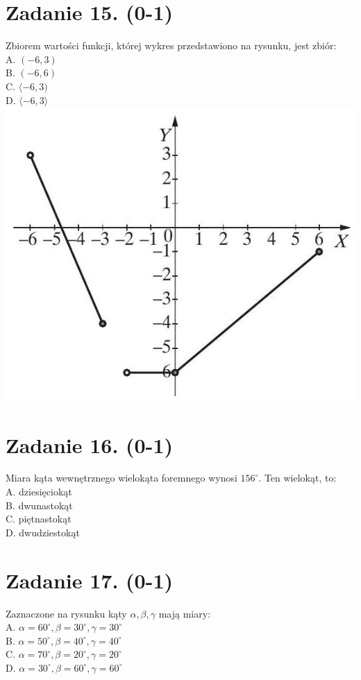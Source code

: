 \documentclass[10pt]{article}
\begin{document}
\section*{Zadanie 15. (0-1)}
Zbiorem wartości funkcji, której wykres przedstawiono na rysunku, jest zbiór:\\
A. \((-6,3)\)\\
B. \((-6,6)\)\\
C. \(\langle-6,3)\)\\
D. \(\langle-6,3\rangle\)\\
\includegraphics[max width=\textwidth, center]{2024_11_21_cdea326d19d0c2132b88g-06}

\section*{Zadanie 16. (0-1)}
Miara kąta wewnętrznego wielokąta foremnego wynosi \(156^{\circ}\). Ten wielokąt, to:\\
A. dziesięciokąt\\
B. dwunastokąt\\
C. piętnastokąt\\
D. dwudziestokąt

\section*{Zadanie 17. (0-1)}
Zaznaczone na rysunku kąty \(\alpha, \beta, \gamma\) mają miary:\\
A. \(\alpha=60^{\circ}, \beta=30^{\circ}, \gamma=30^{\circ}\)\\
B. \(\alpha=50^{\circ}, \beta=40^{\circ}, \gamma=40^{\circ}\)\\
C. \(\alpha=70^{\circ}, \beta=20^{\circ}, \gamma=20^{\circ}\)\\
D. \(\alpha=30^{\circ}, \beta=60^{\circ}, \gamma=60^{\circ}\)
\end{document}
